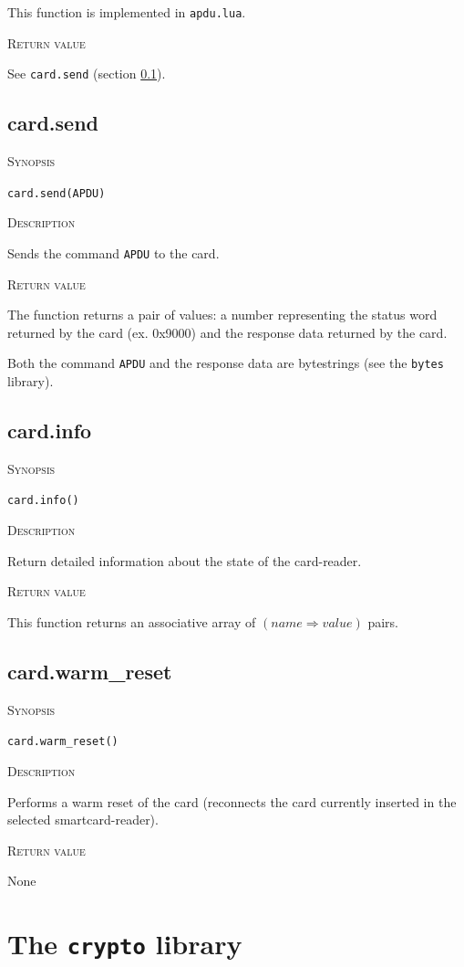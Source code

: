 \documentclass[11pt]{report}
\newcommand{\mansection}[1]{\vspace{0.5em}\par\noindent\textsc{#1}\vspace{0.5em}\par}
\newcommand{\syn}[1]{\texttt{#1}}
\begin{document}
  This function is implemented in \syn{apdu.lua}.

\mansection{Return value}
  See \syn{card.send} (section \ref{sec:card_send}).


\subsection{card.send}
\label{sec:card_send}

\mansection{Synopsis}
\syn{card.send(APDU)}

\mansection{Description}
  Sends the command \syn{APDU} to the card. 

\mansection{Return value}
  The function returns a pair of values: a number representing the status word 
  returned by the card (ex. 0x9000) and the response data returned by the card.
  
  Both the command \syn{APDU} and the response data are bytestrings 
  (see the \syn{bytes} library).


\subsection{card.info}

\mansection{Synopsis}
\syn{card.info()}

\mansection{Description}
  Return detailed information about the state of the card-reader.

\mansection{Return value}
  This function returns an associative array of $(name \Rightarrow value)$ pairs.


\subsection{card.warm\_reset}

\mansection{Synopsis}
\syn{card.warm\_reset()}

\mansection{Description}
  Performs a warm reset of the card 
  (reconnects the card currently inserted in the selected smartcard-reader).

\mansection{Return value}
  None

\section{The \syn{crypto} library}
\end{document}
